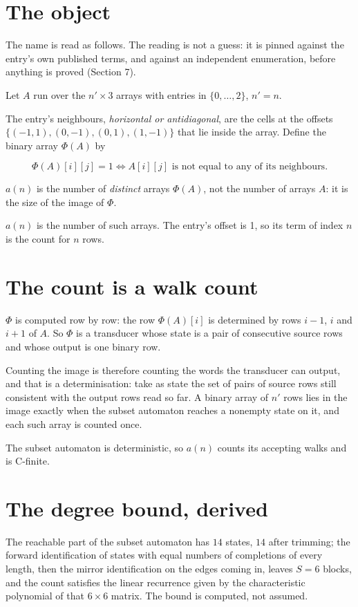 \documentclass[11pt]{article}
\theoremstyle{definition}
\begin{document}
\section{The object}

The name is read as follows. The reading is not a guess: it is pinned against the entry's own published terms, and against an independent enumeration, before anything is proved (Section 7).

Let $A$ run over the $n' \times 3$ arrays with entries in $\{0,\dots,2\}$, $n' = n$.

The entry's neighbours, {\itshape horizontal or antidiagonal}, are the cells at the offsets $\{(-1,1), (0,-1), (0,1), (1,-1)\}$ that lie inside the array. Define the binary array $\Phi(A)$ by

\[\Phi(A)[i][j] = 1 \iff A[i][j] \text{ is not equal to any of its neighbours}.\]

$a(n)$ is the number of {\itshape distinct} arrays $\Phi(A)$, not the number of arrays $A$: it is the size of the image of $\Phi$.

$a(n)$ is the number of such arrays. The entry's offset is 1, so its term of index $n$ is the count for $n$ rows.

\section{The count is a walk count}

$\Phi$ is computed row by row: the row $\Phi(A)[i]$ is determined by rows $i-1$, $i$ and $i+1$ of $A$. So $\Phi$ is a transducer whose state is a pair of consecutive source rows and whose output is one binary row.

Counting the image is therefore counting the words the transducer can output, and that is a determinisation: take as state the set of pairs of source rows still consistent with the output rows read so far. A binary array of $n'$ rows lies in the image exactly when the subset automaton reaches a nonempty state on it, and each such array is counted once.

The subset automaton is deterministic, so $a(n)$ counts its accepting walks and is C-finite.

\section{The degree bound, derived}

The reachable part of the subset automaton has $14$ states, $14$ after trimming; the forward identification of states with equal numbers of completions of every length, then the mirror identification on the edges coming in, leaves $S = 6$ blocks, and the count satisfies the linear recurrence given by the characteristic polynomial of that $6\times6$ matrix. The bound is computed, not assumed.
\end{document}
